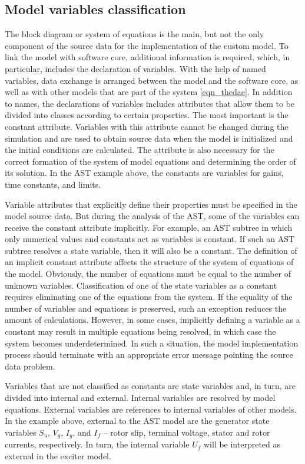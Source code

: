 \documentclass[lettersize,journal]{IEEEtran}
\begin{document}
\subsection{Model variables classification} \label{sec_varclass}
The block diagram or system of equations is the main, but not the only component of the source data for the implementation 
of the custom model. To link the model with software core, additional information is required, which, in particular, 
includes the declaration of variables. With the help of named variables, data exchange is arranged between 
the model and the software core, as well as with other models that are part of the system \eqref{eqn_thedae}. 
In addition to names, the declarations of variables includes attributes that allow them to be divided into classes according to
certain properties. The most important is the constant attribute. Variables with this attribute cannot be changed during the
simulation and are used to obtain source data when the model is initialized and the initial conditions are calculated. 
The attribute is also necessary for the correct formation of the system of model equations and determining the order of its solution. In the AST example above, the constants are variables for gains, time constants, and limits.

Variable attributes that explicitly define their properties must be specified in the model source data. But during the analysis
of the AST, some of the variables can receive the constant attribute implicitly. For example, an AST subtree in which only 
numerical values and constants act as variables is constant. If such an AST subtree resolves a state variable, then it will 
also be a constant. The definition of an implicit constant attribute affects the structure of the system of equations of the model.
Obviously, the number of equations must be equal to the number of unknown variables. Classification of one of the state variables 
as a constant requires eliminating one of the equations from the system. If the equality of the number of variables and 
equations is preserved, such an exception reduces the amount of calculations. However, in some cases, implicitly defining 
a variable as a constant may result in multiple equations being resolved, in which case the system becomes underdetermined. 
In such a situation, the model implementation process should terminate with an appropriate error message pointing the source data
problem.

Variables that are not classified as constants are state variables and, in turn, are divided into internal and external. 
Internal variables are resolved by model equations. External variables are references to internal variables of other models. 
In the example above, external to the AST model are the generator state variables \(S_u\), \(V_g\), \(I_g\), and \(I_f\) – 
rotor slip, terminal voltage, stator and rotor currents, respectively. In turn, the internal variable \(U_f\) will be interpreted as
external in the exciter model.
\end{document}
